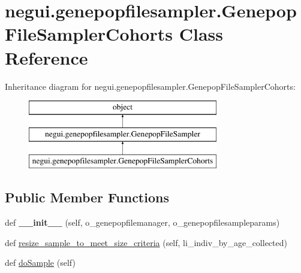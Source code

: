 \hypertarget{classnegui_1_1genepopfilesampler_1_1GenepopFileSamplerCohorts}{}\section{negui.\+genepopfilesampler.\+Genepop\+File\+Sampler\+Cohorts Class Reference}
\label{classnegui_1_1genepopfilesampler_1_1GenepopFileSamplerCohorts}
Inheritance diagram for negui.\+genepopfilesampler.\+Genepop\+File\+Sampler\+Cohorts\+:\begin{figure}[H]
\begin{center}
\leavevmode
\includegraphics[height=3.000000cm]{classnegui_1_1genepopfilesampler_1_1GenepopFileSamplerCohorts}
\end{center}
\end{figure}
\subsection*{Public Member Functions}
\begin{DoxyCompactItemize}
\item 
def {\bfseries \+\_\+\+\_\+init\+\_\+\+\_\+} (self, o\+\_\+genepopfilemanager, o\+\_\+genepopfilesampleparams)\hypertarget{classnegui_1_1genepopfilesampler_1_1GenepopFileSamplerCohorts_a2b4fa2321a676910d8b11ec2df48fbbf}{}\label{classnegui_1_1genepopfilesampler_1_1GenepopFileSamplerCohorts_a2b4fa2321a676910d8b11ec2df48fbbf}

\item 
def \hyperlink{classnegui_1_1genepopfilesampler_1_1GenepopFileSamplerCohorts_a765e68f8d835bde418cd8c3005b0a97a}{resize\+\_\+sample\+\_\+to\+\_\+meet\+\_\+size\+\_\+criteria} (self, li\+\_\+indiv\+\_\+by\+\_\+age\+\_\+collected)
\item 
def \hyperlink{classnegui_1_1genepopfilesampler_1_1GenepopFileSamplerCohorts_a36977cef305c268768a1ede56ab7fc63}{do\+Sample} (self)
\end{DoxyCompactItemize}


